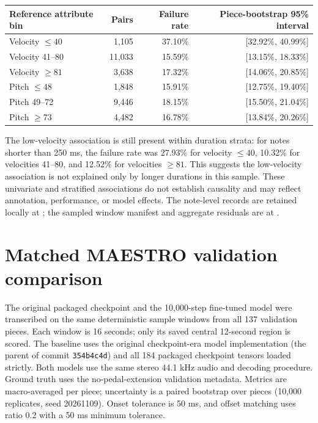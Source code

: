 \documentclass[11pt]{article}
\begin{document}
\begin{center}
\begin{tabular}{lrrr}
\toprule
\textbf{Reference attribute bin} & \textbf{Pairs} & \textbf{Failure rate} &
\textbf{Piece-bootstrap 95\% interval} \\
\midrule
Velocity $\leq 40$ & 1,105 & 37.10\% & [32.92\%, 40.99\%] \\
Velocity 41--80 & 11,033 & 15.59\% & [13.15\%, 18.33\%] \\
Velocity $\geq 81$ & 3,638 & 17.32\% & [14.06\%, 20.85\%] \\
Pitch $\leq 48$ & 1,848 & 15.91\% & [12.75\%, 19.40\%] \\
Pitch 49--72 & 9,446 & 18.15\% & [15.50\%, 21.04\%] \\
Pitch $\geq 73$ & 4,482 & 16.78\% & [13.84\%, 20.26\%] \\
\bottomrule
\end{tabular}
\end{center}

The low-velocity association is still present within duration strata: for
notes shorter than 250 ms, the failure rate was 27.93\% for velocity
$\leq 40$, 10.32\% for velocities 41--80, and 12.52\% for velocities
$\geq 81$. This suggests the low-velocity association is not explained only
by longer durations in this sample. These univariate and stratified
associations do not establish causality and may reflect annotation,
performance, or model effects. The note-level records are retained locally
at ; the sampled
window manifest and aggregate residuals are at
.

\section{Matched MAESTRO validation comparison}

The original packaged checkpoint and the 10,000-step fine-tuned model were
transcribed on the same deterministic sample windows from all 137 validation
pieces. Each window is 16 seconds; only its saved central 12-second region is
scored. The baseline uses the original checkpoint-era model implementation
(the parent of commit \texttt{354b4c4d}) and all 184 packaged checkpoint
tensors loaded strictly. Both models use the same stereo 44.1 kHz audio and
decoding procedure. Ground truth uses the no-pedal-extension validation
metadata. Metrics are macro-averaged per piece; uncertainty is a paired
bootstrap over pieces (10,000 replicates, seed 20261109). Onset tolerance is
50 ms, and offset matching uses ratio 0.2 with a 50 ms minimum tolerance.
\end{document}
